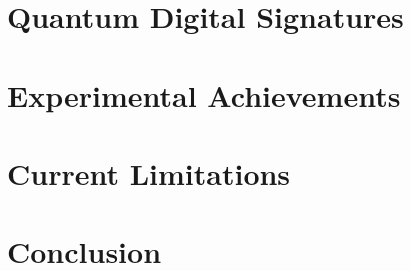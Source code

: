 \documentclass[%
 reprint,
 amsmath,amssymb,
 aps,
 pra,
]{revtex4-1}
\begin{document}
\section{Quantum Digital Signatures}

\section{Experimental Achievements}

\section{Current Limitations}

\section{Conclusion}

\end{document}
